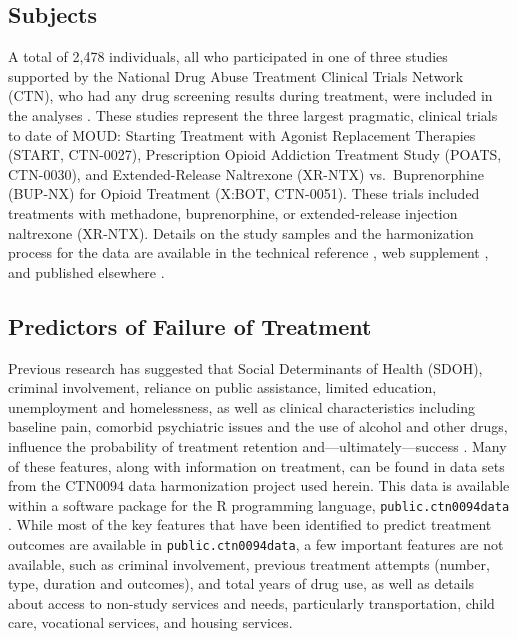 \documentclass[
  number,
  preprint,
  3p,
  onecolumn]{elsarticle}
\begin{document}
\subsection{Subjects}\label{subjects}

A total of 2,478 individuals, all who participated in one of three
studies supported by the National Drug Abuse Treatment Clinical Trials
Network (CTN), who had any drug screening results during treatment, were
included in the analyses
\citep{saxon2013, weiss2011, lee2018, R-public.ctn0094data}. These
studies represent the three largest pragmatic, clinical trials to date
of MOUD: Starting Treatment with Agonist Replacement Therapies (START,
CTN-0027), Prescription Opioid Addiction Treatment Study (POATS,
CTN-0030), and Extended-Release Naltrexone (XR-NTX) vs.~Buprenorphine
(BUP-NX) for Opioid Treatment (X:BOT, CTN-0051). These trials included
treatments with methadone, buprenorphine, or extended-release injection
naltrexone (XR-NTX). Details on the study samples and the harmonization
process for the data are available in the technical reference
\citep{balise_technical_2025}, web supplement
\citep{balise_supplement_2025}, and published elsewhere
\citep{raymondbalise2024}.

\subsection{Predictors of Failure of
Treatment}\label{predictors-of-failure-of-treatment}

Previous research has suggested that Social Determinants of Health
(SDOH), criminal involvement, reliance on public assistance, limited
education, unemployment and homelessness, as well as clinical
characteristics including baseline pain, comorbid psychiatric issues and
the use of alcohol and other drugs, influence the probability of
treatment retention and---ultimately---success
\citep{hser1997, biondi2022, pretreat1981, comptoniii2003, mclellan1983}.
Many of these features, along with information on treatment, can be
found in data sets from the CTN0094 data harmonization project used
herein. This data is available within a software package for the R
programming language, \texttt{public.ctn0094data}
\citep{public.ctn0094data}. While most of the key features that have
been identified to predict treatment outcomes are available in
\texttt{public.ctn0094data}, a few important features are not available,
such as criminal involvement, previous treatment attempts (number, type,
duration and outcomes), and total years of drug use, as well as details
about access to non-study services and needs, particularly
transportation, child care, vocational services, and housing services.
\end{document}
